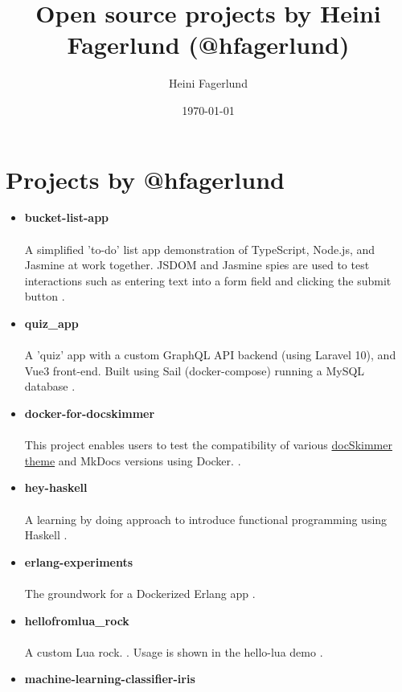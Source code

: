 \documentclass[11pt]{article}
\author{Heini Fagerlund}
\date{\today}
\title{Open source projects by Heini Fagerlund (@hfagerlund)}
\begin{document}
\maketitle
\section{Projects by @hfagerlund}
\label{sec:orge5d0d8b}
\begin{itemize}
\item \textbf{bucket-list-app}
\paragraph{}
A simplified 'to-do' list app demonstration of TypeScript, Node.js, and
Jasmine at work together. JSDOM and Jasmine spies are used to test
interactions such as entering text into a form field and clicking
the submit button \cite{bucket-list-app}.
\item \textbf{quiz\_app}
\paragraph{}
A 'quiz' app with a custom GraphQL API backend (using Laravel 10), and Vue3 front-end. Built using Sail (docker-compose) running a MySQL database \cite{quiz-app}.
\item \textbf{docker-for-docskimmer}
\paragraph{}
This project enables users to test the compatibility of various \href{https://github.com/hfagerlund/mkdocs-docskimmer}{docSkimmer theme} and MkDocs versions using Docker. \cite{docker}.
\item \textbf{hey-haskell}
\paragraph{}
A learning by doing approach to introduce functional programming using Haskell \cite{hey-haskell}.
\item \textbf{erlang-experiments}
\paragraph{}
The groundwork for a Dockerized Erlang app \cite{erlang}.
\item \textbf{hellofromlua\_rock}
\paragraph{}
A custom Lua rock. \cite{luarock}. Usage is shown in the hello-lua demo \cite{lua}.
\item \textbf{machine-learning-classifier-iris}

\end{itemize}
\end{document}
